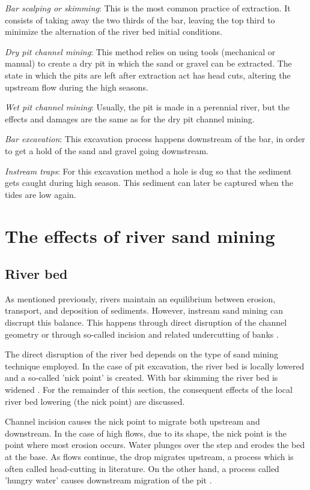 \textit{Bar scalping or skimming}:
This is the most common practice of extraction. It consists of taking away the two thirds of the bar, leaving the top third to minimize the alternation of the river bed initial conditions.

\textit{Dry pit channel mining}:
This method relies on using tools (mechanical or manual) to create a dry pit in which the sand or gravel can be extracted. The state in which the pits are left after extraction act has head cuts, altering the upstream flow during the high seasons.

\textit{Wet pit channel mining}:
Usually, the pit is made in a perennial river, but the effects and damages are the same as for the dry pit channel mining.

\textit{Bar excavation}:
This excavation process happens downstream of the bar, in order to get a hold of the sand and gravel going downstream.

\textit{Instream traps}:
For this excavation method a hole is dug so that the sediment gets caught during high season. This sediment can later be captured when the tides are low again.



\section{The effects of river sand mining}
\subsection{River bed}
As mentioned previously, rivers maintain an equilibrium between erosion, transport, and deposition of sediments. However, instream sand mining can discrupt this balance. This happens through direct disruption of the channel geometry or through so-called incision and related undercutting of banks \autocite{sand-mining-boek}.

The direct disruption of the river bed depends on the type of sand mining technique employed. In the case of pit excavation, the river bed is locally lowered and a so-called 'nick point' is created. With bar skimming the river bed is widened \autocite{sand-mining-boek}. For the remainder of this section, the consequent effects of the local river bed lowering (the nick point) are discussed.

Channel incision causes the nick point to migrate both upstream and downstream. In the case of high flows, due to its shape, the nick point is the point where most erosion occurs. Water plunges over the step and erodes the bed at the base. As flows continue, the drop migrates upstream, a process which is often called head-cutting in literature. On the other hand, a process called 'hungry water' causes downstream migration of the pit \autocite{sand-mining-boek}.

